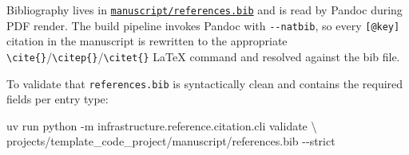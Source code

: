 \documentclass[
]{article}
\newenvironment{Shaded}{}{}
\newcommand{\AttributeTok}[1]{\textcolor[rgb]{0.49,0.56,0.16}{#1}}
\newcommand{\DataTypeTok}[1]{\textcolor[rgb]{0.56,0.13,0.00}{#1}}
\newcommand{\ExtensionTok}[1]{#1}
\newcommand{\NormalTok}[1]{#1}
\begin{document}
Bibliography lives in
\href{references.bib}{\texttt{manuscript/references.bib}} and is read by
Pandoc during PDF render. The build pipeline invokes Pandoc with
\texttt{-\/-natbib}, so every \texttt{{[}@key{]}} citation in the
manuscript is rewritten to the appropriate
\texttt{\textbackslash{}cite\{\}}/\texttt{\textbackslash{}citep\{\}}/\texttt{\textbackslash{}citet\{\}}
LaTeX command and resolved against the bib file.

To validate that \texttt{references.bib} is syntactically clean and
contains the required fields per entry type:

\begin{Shaded}
\begin{Highlighting}[]
\ExtensionTok{uv}\NormalTok{ run python }\AttributeTok{{-}m}\NormalTok{ infrastructure.reference.citation.cli validate }\DataTypeTok{\textbackslash{}}
\NormalTok{    projects/template\_code\_project/manuscript/references.bib }\AttributeTok{{-}{-}strict}
\end{Highlighting}
\end{Shaded}




\clearpage


\end{document}
